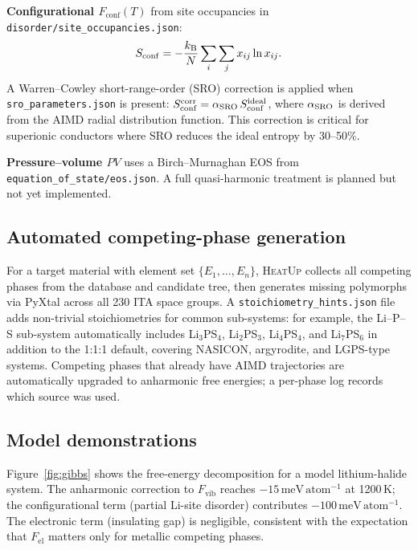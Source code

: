 \documentclass[twocolumn,10pt]{article}
\newcommand{\kB}{k_{\mathrm{B}}}
\newcommand{\Fvib}{F_{\mathrm{vib}}}
\newcommand{\Fel}{F_{\mathrm{el}}}
\newcommand{\Fconf}{F_{\mathrm{conf}}}
\newcommand{\meVat}{\,\mathrm{meV\,atom^{-1}}}
\newcommand{\tp}{\textsc{HeatUp}}
\begin{document}
\textbf{Configurational $\Fconf(T)$} from site occupancies in
\texttt{disorder/site\_occupancies.json}:
\begin{equation}
  S_{\rm conf} = -\frac{\kB}{N}\sum_i\sum_j x_{ij}\ln x_{ij}. \label{eq:sconf}
\end{equation}
A Warren--Cowley short-range-order (SRO) correction is applied when
\texttt{sro\_parameters.json} is present:
$S_{\rm conf}^{\rm corr} = \alpha_{\rm SRO}\,S_{\rm conf}^{\rm ideal}$, where
$\alpha_{\rm SRO}$ is derived from the AIMD radial distribution function.
This correction is critical for superionic conductors where SRO reduces the
ideal entropy by 30--50\%\cite{barreda2022anharmonic}.

\textbf{Pressure--volume $PV$} uses a Birch--Murnaghan
EOS\cite{birch1947finite} from \texttt{equation\_of\_state/eos.json}.
A full quasi-harmonic treatment is planned but not yet implemented.

\subsection*{Automated competing-phase generation}

For a target material with element set $\{E_1,\ldots,E_n\}$, \tp{} collects all
competing phases from the database and candidate tree, then generates missing
polymorphs via PyXtal\cite{fredericks2021pyxtal} across all 230 ITA space groups.
A \texttt{stoichiometry\_hints.json} file adds non-trivial stoichiometries for
common sub-systems: for example, the Li--P--S sub-system automatically includes
Li$_3$PS$_4$, Li$_2$PS$_3$, Li$_4$PS$_4$, and Li$_7$PS$_6$ in addition to the
1:1:1 default, covering NASICON, argyrodite, and LGPS-type systems.
Competing phases that already have AIMD trajectories are automatically upgraded
to anharmonic free energies; a per-phase log records which source was used.

\subsection*{Model demonstrations}

Figure~\ref{fig:gibbs} shows the free-energy decomposition for a model
lithium-halide system.
The anharmonic correction to $\Fvib$ reaches $-15\meVat$ at 1200\,K;
the configurational term (partial Li-site disorder) contributes $-100\meVat$.
The electronic term (insulating gap) is negligible, consistent with the
expectation that $\Fel$ matters only for metallic competing phases.
\end{document}
